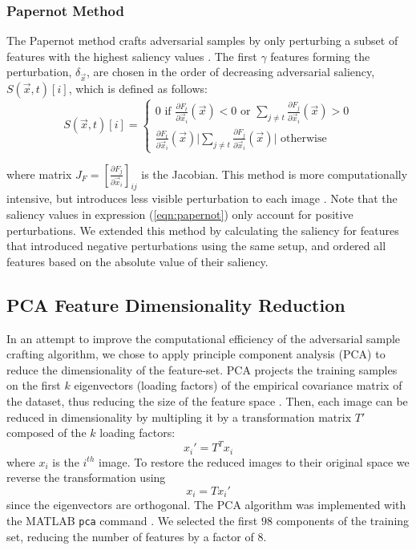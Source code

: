 \subsubsection{Papernot Method}

The Papernot method crafts adversarial samples by only perturbing a subset of features with the highest saliency values \cite{papernot1}. %
The first $\gamma$ features forming the perturbation, $\delta_{\vec{x}}$, are chosen in the order of decreasing adversarial saliency, $S(\vec{x},t)[i]$, which is defined as follows:
\begin{equation} \label{eqn:papernot}
S(\vec{x},t)[i] = \begin{cases}
   0 \text{ if } \frac{\partial F_{t}}{\partial \vec{x}_{i}}(\vec{x}) < 0 \text{ or } \sum_{j \neq t} \frac{\partial F_{j}}{\partial \vec{x}_{i}}(\vec{x}) > 0 \\
   \frac{\partial F_{t}}{\partial \vec{x}_{i}}(\vec{x}) \vert \sum_{j \neq t} \frac{\partial F_{j}}{\partial \vec{x}_{i}}(\vec{x}) \vert \text{       otherwise}
\end{cases}
\end{equation}

where matrix $J_{F} = [\frac{\partial F_{j}}{\partial \vec{x}_{i}}]_{ij}$ is the Jacobian. This method is more computationally intensive, but introduces less visible perturbation to each image \cite{papernot1}. Note that the saliency values in expression (\ref{eqn:papernot}) only account for positive perturbations. We extended this method by calculating the saliency for features that introduced negative perturbations using the same setup, and ordered all features based on the absolute value of their saliency.

\subsection{PCA Feature Dimensionality Reduction} \label{sec:pca}
In an attempt to improve the computational efficiency of the adversarial sample crafting algorithm, we chose to apply principle component analysis (PCA) to reduce the dimensionality of the feature-set. PCA projects the training samples on the first $k$ eigenvectors (loading factors) of the empirical covariance matrix of the dataset, thus reducing the size of the feature space \cite{coursenotes}. Then, each image can be reduced in dimensionality by multipling it by a transformation matrix $T'$ composed of the $k$ loading factors:
\begin{equation}
x_i' = T^T x_i
\end{equation}
where $x_i$ is the $i^{th}$ image. To restore the reduced images to their original space we reverse the transformation using
\begin{equation}
x_i = T x_i' 
\end{equation}
since the eigenvectors are orthogonal. The PCA algorithm was implemented with the MATLAB \texttt{pca} command \cite{matlab}. We selected the first $98$ components of the training set, reducing the number of features by a factor of $8$. 